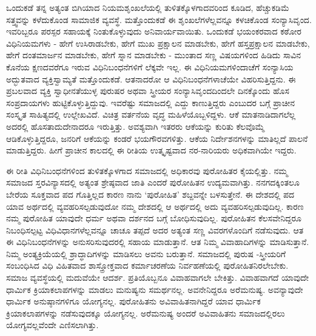 ಒಂದುಕಡೆ ತನ್ನ ಅತ್ಯಂತ ಬಿಗಿಯಾದ ನಿಯಮಶೃಂಖಲೆಯಲ್ಲಿ ತುಳಿತಕ್ಕೊಳಗಾದವರಿಂದ ಕೂಡಿದ, ಹೆಚ್ಚುಕಡಿಮೆ ಸತ್ತ್ವವನ್ನು ಕಳೆದುಕೊಂಡ ಸಾಮಾಜಿಕ ವ್ಯವಸ್ಥೆ. ಮತ್ತೊಂದುಕಡೆ ಈ ಶೃಂಖಲೆಗಳೆಲ್ಲವನ್ನೂ ಕಳಚಿಕೊಂಡ ಸಂನ್ಯಾಸಿವೃಂದ. ಇವರಿಬ್ಬರೂ ಪರಸ್ಪರ ಸಹಾಯಕ್ಕೆ ನಿಂತುಕೊಳ್ಳುವುದು ಅನಿವಾರ್ಯವಾಯಿತು. ಒಂದುಕಡೆ ಭಯಂಕರವಾದ ಕಠೋರ ವಿಧಿನಿಯಮಗಳು - ಹೇಗೆ ಉಸಿರಾಡಬೇಕು, ಹೇಗೆ ಮುಖ ಪ್ರಕ್ಷಾಲನ ಮಾಡಬೇಕು, ಹೇಗೆ ಹಸ್ತಪ್ರಕ್ಷಾಲನ ಮಾಡಬೇಕು, ಹೇಗೆ ದಂತಮಾರ್ಜನ ಮಾಡಬೇಕು, ಹೇಗೆ ಸ್ನಾನ ಮಾಡಬೇಕು - ಮುಂತಾದ ಸಣ್ಣ ವಿಷಯಗಳಿಂದ ಹಿಡಿದು ಸಾವಿನ ಕೊನೆಯ ಕ್ಷಣದವರೆಗೂ ಇರುವ ವಿಧಿನಿಬಂಧನೆಗಳಿಗೆ ಲೆಕ್ಕವೇ ಇಲ್ಲ. ಈ ವಿಧಿನಿಯಮಗಳಿಂದಾಚೆಗೆ ಸಂನ್ಯಾಸಿಯ ಅದ್ಭುತವಾದ ವ್ಯಕ್ತಿಸ್ವಾಮ್ಯತೆ ಮತ್ತೊಂದುಕಡೆ. ಆತನಾದರೋ ಆ ವಿಧಿನಿಬಂಧನೆಗಳಾಚೆಯೇ ವಿಹರಿಸುತ್ತಿದ್ದನು. ಈ ಪ್ರಬಲವಾದ ವ್ಯಕ್ತಿ ಸ್ವಾಧೀನತೆಯುಳ್ಳ ಪುರುಷರ ಅಥವಾ ಸ್ತ್ರೀಯರ ಸಂನ್ಯಾಸಿವೃಂದದಿಂದಲೇ ದಿನಕ್ಕೊಂದು ಹೊಸ ಸಂಪ್ರದಾಯಗಳು ಹುಟ್ಟಿಕೊಳ್ಳುತ್ತಿದ್ದುವು. ಇವರೆಷ್ಟು ಸಮಾಜದಲ್ಲಿ ಎದ್ದು ಕಾಣುತ್ತಿದ್ದರು ಎಂಬುದರ ಬಗ್ಗೆ ಪ್ರಾಚೀನ ಸಂಸ್ಕೃತ ಸಾಹಿತ್ಯದಲ್ಲಿ ಉಲ್ಲೇಖವಿದೆ. ವಿಚಿತ್ರ ವರ್ತನೆಯ ವೃದ್ಧ ಮಹಿಳೆಯೊಬ್ಬಳಿದ್ದಳು. ಆಕೆ ಮಾತನಾಡಿದಾಗಲೆಲ್ಲ ಅದರಲ್ಲಿ ಹೊಸತಾದುದೇನಾದರೂ ಇರುತ್ತಿತ್ತು. ಅವಶ್ಯವಾಗಿ ಇತರರು ಆಕೆಯನ್ನು ಕುರಿತು ಕೆಲವೊಮ್ಮೆ ಆಡಿಕೊಳ್ಳುತ್ತಿದ್ದರೂ, ಜನರಿಗೆ ಆಕೆಯನ್ನು ಕಂಡರೆ ಭಯಗೌರವಗಳಿತ್ತು. ಆಕೆಯ ನಿರ್ದೇಶನಗಳನ್ನು ಮಾತಿಲ್ಲದೆ ಪಾಲನೆ ಮಾಡುತ್ತಿದ್ದರು. ಹೀಗೆ ಪ್ರಾಚೀನ ಕಾಲದಲ್ಲಿ ಈ ರೀತಿಯ ಉತ್ಕೃಷ್ಟವಾದ ನರ-ನಾರಿಯರು ಅಧಿಕವಾಗಿಯೇ ಇದ್ದರು.

ಈ ರೀತಿ ವಿಧಿನಿಬಂಧನೆಗಳಿಂದ ತುಳಿತಕ್ಕೊಳಗಾದ ಸಮಾಜದಲ್ಲಿ ಅಧಿಕಾರವು ಪುರೋಹಿತರ ಕೈಯಲ್ಲಿತ್ತು. ನಮ್ಮ ಸಮಾಜದ ಸ್ತರವಿನ್ಯಾಸದಲ್ಲಿ ಅತ್ಯಂತ ಶ್ರೇಷ್ಠವಾದ ಜಾತಿ ಎಂದರೆ ಪುರೋಹಿತನ ಉದ್ಯಮವಾಗಿತ್ತು. ನನಗದಕ್ಕಿಂತಲೂ ಬೇರೆಯ ಸೂಕ್ತವಾದ ಪದ ಗೊತ್ತಿಲ್ಲದ ಕಾರಣ ನಾನು ‘ಪುರೋಹಿತ’ ಶಬ್ದವನ್ನೇ ಬಳಸುತ್ತೇನೆ. ಈ ದೇಶದಲ್ಲಿ  ಪದ ಯಾವ ಅರ್ಥದಲ್ಲಿ ವ್ಯವಹರಿಸಲ್ಪಡುವುದೋ ನಮ್ಮ ದೇಶದಲ್ಲಿ ಆ ಅರ್ಥದಲ್ಲಿ ಅದು ವ್ಯವಹರಿಸಲ್ಪಡುವುದಿಲ್ಲ. ಕಾರಣ ನಮ್ಮ ಪುರೋಹಿತ ಯಾವುದೇ ಧರ್ಮ ಅಥವಾ ದರ್ಶನದ ಬಗ್ಗೆ ಬೋಧಿಸುವುದಿಲ್ಲ. ಪುರೋಹಿತನ ಕೆಲಸವೇನಿದ್ದರೂ ನಿಬಂಧಿಸಲ್ಪಟ್ಟ ವಿಧಿವಿಧಾನಗಳೆಲ್ಲವನ್ನೂ ಚಾಚೂ ತಪ್ಪದೆ ಅದರ ಅತ್ಯಂತ ಸಣ್ಣ ವಿವರಗಳೊಂದಿಗೆ ನಡೆಸುವುದು. ಆತ ಈ ವಿಧಿನಿಬಂಧನೆಗಳನ್ನು ಅನುಸರಿಸುವುದರಲ್ಲಿ ಸಹಾಯ ಮಾಡುತ್ತಾನೆ. ಆತ ನಿಮ್ಮ ವಿವಾಹಾದಿಗಳನ್ನು ಮಾಡಿಸುತ್ತಾನೆ. ನಿಮ್ಮ ಅಂತ್ಯಕ್ರಿಯೆಯಲ್ಲಿ ಶ್ರಾದ್ಧಾದಿಗಳನ್ನು ಮಾಡಿಸಲು ಅವನು ಬರುತ್ತಾನೆ. ಸಮಾಜದಲ್ಲಿ ಪುರುಷ -ಸ್ತ್ರೀಯರಿಗೆ ಸಂಬಂಧಿಸಿದ ವಿಧಿ ವಿಹಿತವಾದ ಶಾಸ್ತ್ರೋಕ್ತವಾದ ಕರ್ಮಾಚರಣೆಯ ನಿರ್ವಹಣೆಯಲ್ಲಿ ಪುರೋಹಿತನಿರಲೇಬೇಕು. ಸಮಾಜ ವ್ಯವಸ್ಥೆಯಲ್ಲಿ ಮದುವೆಯೇ ಆದರ್ಶ. ಪ್ರತಿಯೊಬ್ಬನೂ ವಿವಾಹವಾಗಲೇ ಬೇಕಿತ್ತು. ವಿವಾಹವಾಗದೆ ಯಾವುದೇ ಧಾರ್ಮಿಕ ಕ್ರಿಯಾಕಲಾಪಗಳನ್ನು ಮಾಡಲು ಮನುಷ್ಯನು ಸಮರ್ಥನಲ್ಲ. ಅವನೇನಿದ್ದರೂ ಅರೆಮನುಷ್ಯ. ಅವನ್ಯಾವುದೇ ಧಾರ್ಮಿಕ ಅನುಷ್ಠಾನಗಳಿಗೂ ಯೋಗ್ಯನಲ್ಲ. ಪುರೋಹಿತನು ಅವಿವಾಹಿತನಾಗಿದ್ದರೆ ಯಾವ ಧಾರ್ಮಿಕ ಕ್ರಿಯಾಕಲಾಪಗಳನ್ನು ನಡೆಸುವುದಕ್ಕೂ ಯೋಗ್ಯನಲ್ಲ. ಅರೆಮನುಷ್ಯ ಅಂದರೆ ಅವಿವಾಹಿತನು ಸಮಾಜದಲ್ಲಿರಲು ಯೋಗ್ಯವಲ್ಲವೆಂದೇ ಎಣಿಸಲಾಗಿತ್ತು.

